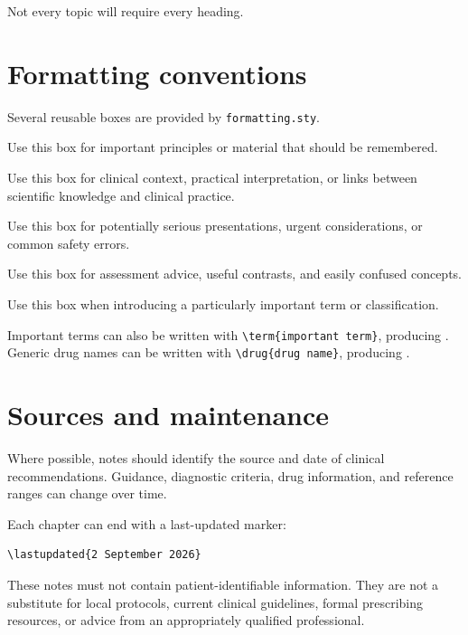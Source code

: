 Not every topic will require every heading.

\section{Formatting conventions}

Several reusable boxes are provided by \texttt{formatting.sty}.

\begin{keypoint}
Use this box for important principles or material that should be
remembered.
\end{keypoint}

\begin{clinicalnote}
Use this box for clinical context, practical interpretation, or links
between scientific knowledge and clinical practice.
\end{clinicalnote}

\begin{redflag}
Use this box for potentially serious presentations, urgent
considerations, or common safety errors.
\end{redflag}

\begin{examtip}
Use this box for assessment advice, useful contrasts, and easily
confused concepts.
\end{examtip}

\begin{definitionbox}
Use this box when introducing a particularly important term or
classification.
\end{definitionbox}

Important terms can also be written with
\verb|\term{important term}|, producing .
Generic drug names can be written with
\verb|\drug{drug name}|, producing .

\section{Sources and maintenance}

Where possible, notes should identify the source and date of clinical
recommendations. Guidance, diagnostic criteria, drug information, and
reference ranges can change over time.

Each chapter can end with a last-updated marker:

\begin{verbatim}
\lastupdated{2 September 2026}
\end{verbatim}

\begin{redflag}
These notes must not contain patient-identifiable information. They are
not a substitute for local protocols, current clinical guidelines,
formal prescribing resources, or advice from an appropriately
qualified professional.
\end{redflag}
